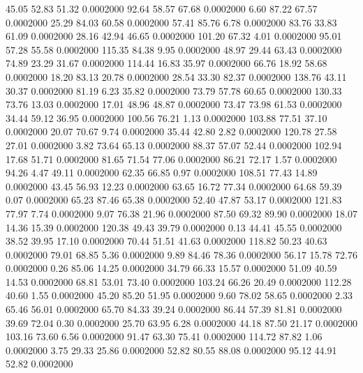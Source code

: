   45.05   52.83   51.32   0.0002000
  92.64   58.57   67.68   0.0002000
   6.60   87.22   67.57   0.0002000
  25.29   84.03   60.58   0.0002000
  57.41   85.76    6.78   0.0002000
  83.76   33.83   61.09   0.0002000
  28.16   42.94   46.65   0.0002000
 101.20   67.32    4.01   0.0002000
  95.01   57.28   55.58   0.0002000
 115.35   84.38    9.95   0.0002000
  48.97   29.44   63.43   0.0002000
  74.89   23.29   31.67   0.0002000
 114.44   16.83   35.97   0.0002000
  66.76   18.92   58.68   0.0002000
  18.20   83.13   20.78   0.0002000
  28.54   33.30   82.37   0.0002000
 138.76   43.11   30.37   0.0002000
  81.19    6.23   35.82   0.0002000
  73.79   57.78   60.65   0.0002000
 130.33   73.76   13.03   0.0002000
  17.01   48.96   48.87   0.0002000
  73.47   73.98   61.53   0.0002000
  34.44   59.12   36.95   0.0002000
 100.56   76.21    1.13   0.0002000
 103.88   77.51   37.10   0.0002000
  20.07   70.67    9.74   0.0002000
  35.44   42.80    2.82   0.0002000
 120.78   27.58   27.01   0.0002000
   3.82   73.64   65.13   0.0002000
  88.37   57.07   52.44   0.0002000
 102.94   17.68   51.71   0.0002000
  81.65   71.54   77.06   0.0002000
  86.21   72.17    1.57   0.0002000
  94.26    4.47   49.11   0.0002000
  62.35   66.85    0.97   0.0002000
 108.51   77.43   14.89   0.0002000
  43.45   56.93   12.23   0.0002000
  63.65   16.72   77.34   0.0002000
  64.68   59.39    0.07   0.0002000
  65.23   87.46   65.38   0.0002000
  52.40   47.87   53.17   0.0002000
 121.83   77.97    7.74   0.0002000
   9.07   76.38   21.96   0.0002000
  87.50   69.32   89.90   0.0002000
  18.07   14.36   15.39   0.0002000
 120.38   49.43   39.79   0.0002000
   0.13   44.41   45.55   0.0002000
  38.52   39.95   17.10   0.0002000
  70.44   51.51   41.63   0.0002000
 118.82   50.23   40.63   0.0002000
  79.01   68.85    5.36   0.0002000
   9.89   84.46   78.36   0.0002000
  56.17   15.78   72.76   0.0002000
   0.26   85.06   14.25   0.0002000
  34.79   66.33   15.57   0.0002000
  51.09   40.59   14.53   0.0002000
  68.81   53.01   73.40   0.0002000
 103.24   66.26   20.49   0.0002000
 112.28   40.60    1.55   0.0002000
  45.20   85.20   51.95   0.0002000
   9.60   78.02   58.65   0.0002000
   2.33   65.46   56.01   0.0002000
  65.70   84.33   39.24   0.0002000
  86.44   57.39   81.81   0.0002000
  39.69   72.04    0.30   0.0002000
  25.70   63.95    6.28   0.0002000
  44.18   87.50   21.17   0.0002000
 103.16   73.60    6.56   0.0002000
  91.47   63.30   75.41   0.0002000
 114.72   87.82    1.06   0.0002000
   3.75   29.33   25.86   0.0002000
  52.82   80.55   88.08   0.0002000
  95.12   44.91   52.82   0.0002000
